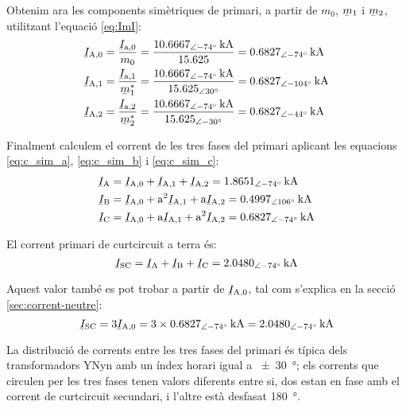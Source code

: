\begin{exemple}
    Obtenim ara les components simètriques de primari, a partir de $m_0$, $\cmplx{m}_1$ i $\cmplx{m}_2$, utilitzant l'equació \eqref{eq:ImI}:
    \begin{align*}
        \cmplx{I}\ped{A,0} &= \frac{\cmplx{I}\ped{a,0}}{m_0} = \frac{\SIpd{10,6667}{-74}{kA}}{\num{15,625}} =  \SIpd{0,6827}{-74}{kA}\\
        \cmplx{I}\ped{A,1} &= \frac{\cmplx{I}\ped{a,1}}{\cmplx{m}^*_1} = \frac{\SIpd{10,6667}{-74}{kA}}{\numpd{15,625}{30}} =  \SIpd{0,6827}{-104}{kA} \\
        \cmplx{I}\ped{A,2} &= \frac{\cmplx{I}\ped{a,2}}{\cmplx{m}^*_2} = \frac{\SIpd{10,6667}{-74}{kA}}{\numpd{15,625}{-30}} = \SIpd{0,6827}{-44}{kA}
    \end{align*}

    Finalment calculem el corrent de les tres fases del primari aplicant les equacions \eqref{eq:c_sim_a}, \eqref{eq:c_sim_b} i \eqref{eq:c_sim_c}:
     \begin{align*}
        \cmplx{I}\ped{A} &= \cmplx{I}\ped{A,0} + \cmplx{I}\ped{A,1} + \cmplx{I}\ped{A,2} = \SIpd{1,8651}{-74}{kA} \\
        \cmplx{I}\ped{B} &= \cmplx{I}\ped{A,0} + \au^2 \cmplx{I}\ped{A,1} + \au \cmplx{I}\ped{A,2} = \SIpd{0,4997}{106}{kA} \\
        \cmplx{I}\ped{C} &= \cmplx{I}\ped{A,0} + \au \cmplx{I}\ped{A,1} + \au^2 \cmplx{I}\ped{A,2} = \SIpd{0,6827}{-74}{kA}
    \end{align*}

    El corrent primari de curtcircuit a terra és:
    \[
        \cmplx{I}\ped{SC} = \cmplx{I}\ped{A} + \cmplx{I}\ped{B} + \cmplx{I}\ped{C} = \SIpd{2,0480}{-74}{kA}
    \]

    Aquest valor també es pot trobar a partir de $\cmplx{I}\ped{A,0}$, tal com s'explica en la secció \vref{sec:corrent-neutre}:
       \[
        \cmplx{I}\ped{SC} = 3 \cmplx{I}\ped{A,0} = 3 \times \SIpd{0,6827}{-74}{kA} = \SIpd{2,0480}{-74}{kA}
    \]

    La distribució de corrents entre les tres fases del primari és típica dels transformadors YNyn amb un índex horari igual a \SI{+-30}{\degree}; els corrents que circulen per les tres fases tenen valors diferents entre si, dos estan en fase amb el corrent de curtcircuit secundari, i l'altre està desfasat \SI{180}{\degree}.


\end{exemple}
